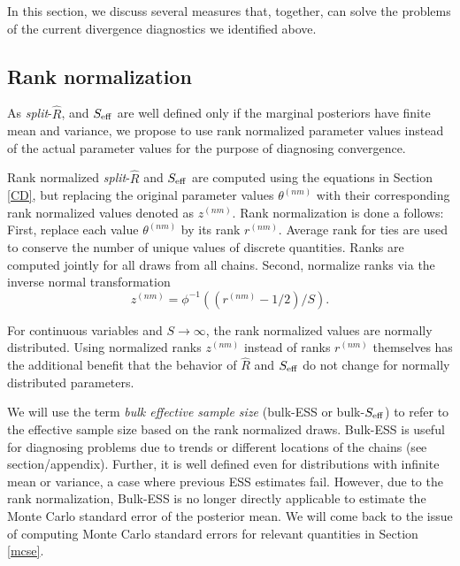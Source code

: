 \documentclass[american,]{article}
\begin{document}
In this section, we discuss several measures that, together, can solve
the problems of the current divergence diagnostics we identified above.

\hypertarget{rank-normalization}{%
\subsection{Rank normalization}\label{rank-normalization}}

As \emph{split}-\(\widehat{R}\), and \(S_{\rm eff}\) are well defined
only if the marginal posteriors have finite mean and variance, we
propose to use rank normalized parameter values instead of the actual
parameter values for the purpose of diagnosing convergence.

Rank normalized \emph{split}-\(\widehat{R}\) and \(S_{\rm eff}\) are
computed using the equations in Section \ref{CD}, but
replacing the original parameter values \(\theta^{(nm)}\) with their
corresponding rank normalized values denoted as \(z^{(nm)}\). Rank
normalization is done a follows: First, replace each value
\(\theta^{(nm)}\) by its rank \(r^{(nm)}\). Average rank for ties are
used to conserve the number of unique values of discrete quantities.
Ranks are computed jointly for all draws from all chains. Second,
normalize ranks via the inverse normal transformation
\begin{equation}
z^{(nm)} = \phi^{-1}((r^{(nm)}-1/2)/S).
\end{equation}

For continuous variables and \(S \rightarrow \infty\), the rank
normalized values are normally distributed. Using normalized ranks
\(z^{(nm)}\) instead of ranks \(r^{(nm)}\) themselves has the additional
benefit that the behavior of \(\widehat{R}\) and \(S_{\rm eff}\) do
not change for normally distributed parameters.

We will use the term \emph{bulk effective sample size} (bulk-ESS or
bulk-\(S_{\rm eff}\)) to refer to the effective sample size based on the
rank normalized draws. Bulk-ESS is useful for diagnosing problems due to
trends or different locations of the chains (see section/appendix). Further, it is
well defined even for distributions with infinite mean or variance, a
case where previous ESS estimates fail. However, due to the rank
normalization, Bulk-ESS is no longer directly applicable to estimate the
Monte Carlo standard error of the posterior mean. We will come back to
the issue of computing Monte Carlo standard errors for relevant
quantities in Section \ref{mcse}.
\end{document}
